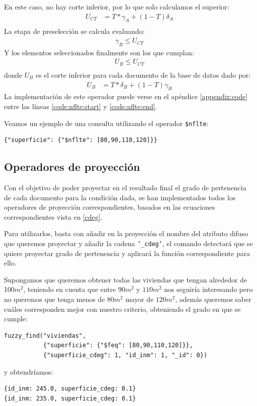 En este caso, no hay corte inferior, por lo que solo calculamos el superior:
%
\begin{align*}
    U_{CT} &= T * \gamma_A + (1-T)\delta_A \\
\end{align*}
%
La etapa de preselección se calcula evaluando:
%
\begin{align*}
    \gamma_B \leq U_{CT}
\end{align*}
%
Y los elementos seleccionados finalmente son los que cumplan:
%
\begin{align*}
    U_B \leq U_{CT} \\
\end{align*}
%
donde $U_B$ es el corte inferior para cada documento de la base de datos dado por:
%
\begin{align*}
    U_B &= T * \delta_B + (1-T)\gamma_B
\end{align*}
%
La implementación de este operador puede verse en el apéndice \ref{appendix:code} entre las líneas \ref{code:nflte:start} y \ref{code:nflte:end}.

\begin{example}
Veamos un ejemplo de una consulta utilizando el operador \texttt{\$nflte}:
%
\begin{verbatim}
{"superficie": {"$nflte": [80,90,110,120]}}
\end{verbatim}

\end{example}

\subsection{Operadores de proyección}

Con el objetivo de poder proyectar en el resultado final el grado de pertenencia de cada documento para la condición dada, se han implementados todos los operadores de proyección correspondientes, basados en las ecuaciones correspondientes vista en \ref{cdeg}.

Para utilizarlos, basta con añadir en la proyección el nombre del atributo difuso que queremos proyectar y añadir la cadena \texttt{'\_cdeg'}, el comando detectará que se quiere proyectar grado de pertenencia y aplicará la función correspondiente para ello.

\begin{example}
Supongamos que queremos obtener todas las viviendas que tengan alrededor de 100$m^2$, teniendo en cuenta que entre $90m^2$ y $110m^2$ nos seguiría interesando pero no queremos que tenga menos de $80m^2$  mayor de $120m^2$, además queremos saber cuáles corresponden mejor con nuestro criterio, obteniendo el grado en que se cumple:
%
\begin{verbatim}
fuzzy_find("viviendas", 
           {"superficie": {"$feq": [80,90,110,120]}}, 
           {"superficie_cdeg": 1, "id_inm": 1, "_id": 0})
\end{verbatim}
%
y obtendríamos:
%
\begin{lstlisting}[numbers=none]
{id_inm: 245.0, superficie_cdeg: 0.1}
{id_inm: 235.0, superficie_cdeg: 0.1}
\end{lstlisting}
%
\end{example}
